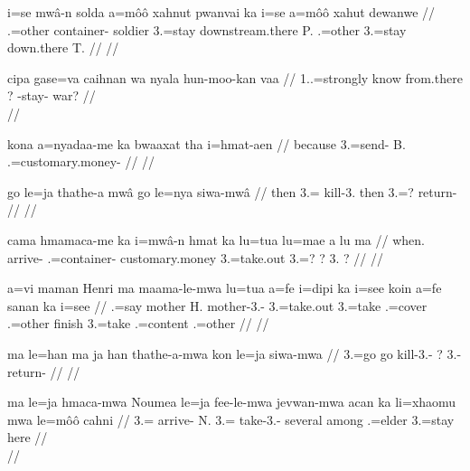 \documentclass{article}
\begin{document}
\a
\begingl
\gla 
i=se mwâ-n solda a=môô xahnut pwanvai ka i=se a=môô xahut dewanwe
// \glb {}.=other container- soldier 3.=stay downstream.there P.  .=other 3.=stay down.there T.
// \glft {}
// \endgl

\a
\begingl
\gla 
cipa gase=va caihnan wa nyala hun-moo-kan vaa
// \glb {} 1..=strongly know from.there ? -stay- war?
// \glft {} \\ 
// \endgl

\a
\begingl
\gla kona a=nyadaa-me ka bwaaxat tha i=hmat-aen 
// \glb because 3.=send-  B.  .=customary.money-
// \glft {}
// \endgl

\a
\begingl
\gla go le=ja thathe-a mwâ go le=nya siwa-mwâ 
// \glb then 3.= kill-3.  then 3.=? return-
// \glft {}
// \endgl

\a
\begingl
\gla 
cama hmamaca-me ka i=mwâ-n hmat ka lu=tua lu=mae a lu ma
// \glb when. arrive-  .=container- customary.money  3.=take.out 3.=? ? 3. ?
// \glft {}
// \endgl

\a
\begingl
\gla a=vi maman Henri ma maama-le-mwa lu=tua a=fe i=dipi ka i=see koin a=fe sanan ka i=see 
// .=say mother H.  mother-3.- 3.=take.out 3.=take .=cover  .=other finish 3.=take .=content  .=other
// \glft  {}
// \endgl

\a
\begingl
\gla 
ma le=han ma ja han thathe-a-mwa kon le=ja siwa-mwa 
// \glb {} 3.=go   go kill-3.- ? 3.- return-
// \glft {}
// \endgl

\a
\begingl
\gla ma le=ja hmaca-mwa Noumea le=ja fee-le-mwa jevwan-mwa acan ka li=xhaomu mwa le=môô cahni 
// \glb {} 3.= arrive- N. 3.= take-3.- several among  .=elder  3.=stay here
// \glft {}\\ 
// \endgl
\end{document}

